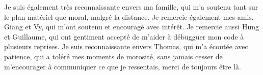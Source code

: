 Je suis également très reconnaissante envers ma famille, qui m'a soutenu tant sur le plan matériel que moral, malgré la distance.
Je remercie également mes amis, Giang et Vy, qui m'ont soutenu et encouragé avec intérêt. Je remercie aussi Hưng et Guillaume, qui ont gentiment accepté de m'aider à débugguer mon code à plusieurs reprises. Je suis reconnaissante envers Thomas, qui m'a écoutée avec patience, qui a toléré mes moments de morosité, sans jamais cesser de m'encourager à communiquer ce que je ressentais, merci de toujours être là.
